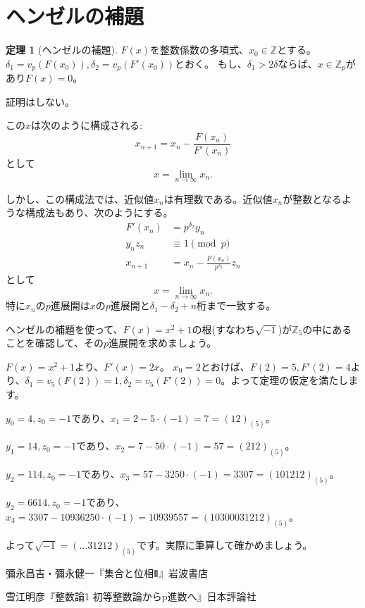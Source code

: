\documentclass[uplatex]{jsarticle}
\newcommand{\Z}{\mathbb{Z}}
\theoremstyle{definition} %
\newtheorem{thm}{定理}
\begin{document}
\section{ヘンゼルの補題}

\begin{oframed}\begin{thm}[ヘンゼルの補題]
$F(x)$を整数係数の多項式、$x_0 \in \Z$とする。
$\delta_1 = v_p(F(x_0)), \delta_2 = v_p(F'(x_0))$とおく。
もし、$\delta_1 > 2 \delta$ならば、$x \in \Z_p$があり$F(x)=0$。
\end{thm}\end{oframed}
証明はしない。

この$x$は次のように構成される:
\[x_{n+1} = x_n - \frac{F(x_n)}{F'(x_n)}\]
として
\[x = \lim_{n\to\infty}x_n.\]

しかし、この構成法では、近似値$x_n$は有理数である。近似値$x_n$が整数となるような構成法もあり、次のようにする。
\begin{align*}
F'(x_n) &= p^{\delta_2} y_n\\
y_n z_n &\equiv 1 \pmod p\\
x_{n+1} &= x_n - \frac{F(x_n)}{p^{\delta_2}} z_n
\end{align*}
として
\[x = \lim_{n\to\infty}x_n.\]
特に$x_n$の$p$進展開は$x$の$p$進展開と$\delta_1 - \delta_2 + n$桁まで一致する。

ヘンゼルの補題を使って、$F(x) = x^2+1$の根(すなわち$\sqrt{-1}$)が$\Z_5$の中にあることを確認して、その$p$進展開を求めましょう。

$F(x) = x^2+1$より、$F'(x) = 2x$。
$x_0 = 2$とおけば、$F(2) = 5, F'(2) = 4$より、$\delta_1 = v_5(F(2)) = 1, \delta_2 = v_5(F'(2)) = 0$。よって定理の仮定を満たします。

$y_0 = 4, z_0 = -1$であり、$x_1 = 2 - 5 \cdot (-1) = 7 = (12)_{(5)}$。

$y_1 = 14, z_0 = -1$であり、$x_2 = 7 - 50 \cdot (-1) = 57 = (212)_{(5)}$。

$y_2 = 114, z_0 = -1$であり、$x_3 = 57 - 3250 \cdot (-1) = 3307 = (101212)_{(5)}$。

$y_2 = 6614, z_0 = -1$であり、$x_3 = 3307 - 10936250 \cdot (-1) = 10939557 = (10300031212)_{(5)}$。

よって$\sqrt{-1} = (\dots31212)_{(5)}$です。実際に筆算して確かめましょう。

\begin{thebibliography}{9}
\item 彌永昌吉・彌永健一『集合と位相Ⅱ』岩波書店
\item 雪江明彦『整数論1 初等整数論からp進数へ』日本評論社
\end{thebibliography}
\end{document}
